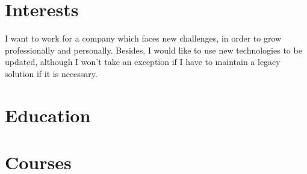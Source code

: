 \documentclass[letterpaper]{twentysecondcv} %
\begin{document}

\section{Interests}

I want to work for a company which faces new challenges, in order to grow professionally and personally. Besides, I would like to use new technologies to be updated, although I won't take an exception if I have to maintain a legacy solution if it is necessary.

\section{Education}

\begin{twenty} %
\end{twenty}



\section{Courses}

 \begin{twenty}
 \end{twenty}
\end{document}

